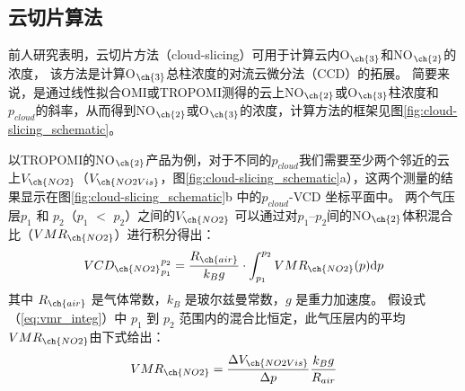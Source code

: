 \subsection{云切片算法} \label{sec:cloud-slicing}

前人研究表明，云切片方法（cloud-slicing）可用于计算云内O$_{\ch{3}}$和NO$_{\ch{2}}$的浓度，
该方法是计算O$_{\ch{3}}$总柱浓度的对流云微分法（CCD）的拓展\citep{Ziemke.1998,Ziemke.2001}。
简要来说，是通过线性拟合OMI或TROPOMI测得的云上NO$_{\ch{2}}$或O$_{\ch{3}}$柱浓度和$p_{cloud}$的斜率，从而得到NO$_{\ch{2}}$或O$_{\ch{3}}$的浓度，计算方法的框架见图\ref{fig:cloud-slicing_schematic}。

以TROPOMI的NO$_{\ch{2}}$产品为例，对于不同的$p_{cloud}$我们需要至少两个邻近的云上$V_{\ch{NO2}}$（$V_{\ch{NO2Vis}}$，图\ref{fig:cloud-slicing_schematic}a），这两个测量的结果显示在图\ref{fig:cloud-slicing_schematic}b 中的$p_{cloud}$-VCD 坐标平面中。
两个气压层$p_1$ 和 $p_2$（$p_1$ $<$ $p_2$）之间的$V_{\ch{NO2}}$
可以通过对$p_1$--$p_2$间的NO$_{\ch{2}}$体积混合比（$VMR_{\ch{NO2}}$）进行积分得出：
\begin{equation} \label{eq:vmr_integ}
{VCD_{\ch{NO2}}}_{p_1}^{p_2}=\frac{R_{\ch{air}}}{k_Bg} \cdot \int_{p_1}^{p_2} VMR_{\ch{NO2}}(p) \mathrm{d} p
\end{equation}
其中 $R_{\ch{air}}$ 是气体常数，$k_B$ 是玻尔兹曼常数，$g$ 是重力加速度。
假设式（\ref{eq:vmr_integ}）中 $p_1$ 到 $p_2$ 范围内的混合比恒定，此气压层内的平均$VMR_{\ch{NO2}}$由下式给出：
\begin{equation}
VMR_{\ch{NO2}} = \frac{\Delta V_{\ch{NO2Vis}}}{\Delta p} \frac{k_B g}{R_{air}}
\end{equation}

